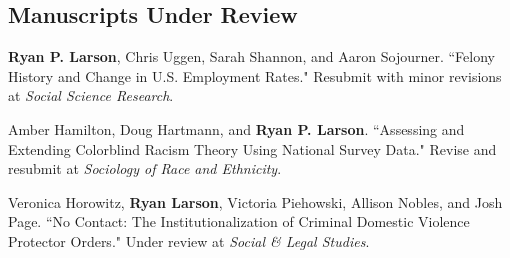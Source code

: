 \documentclass[letterpaper]{article}
\renewenvironment{itemize}{
  \begin{list}{}{
    \setlength{\leftmargin}{1.5em}
  }
}{
  \end{list}
}
\begin{document}
\subsection*{Manuscripts Under Review}
\begin{itemize}

\item  \textbf{Ryan P. Larson}, Chris Uggen, Sarah Shannon, and Aaron Sojourner. ``Felony History and Change in U.S. Employment Rates." Resubmit with minor revisions at \textit{Social Science Research}.

\item Amber Hamilton, Doug Hartmann, and \textbf{Ryan P. Larson}. ``Assessing and Extending Colorblind Racism Theory Using National Survey Data." Revise and resubmit at \textit{Sociology of Race and Ethnicity}. 

\item Veronica Horowitz,  \textbf{Ryan Larson}, Victoria Piehowski, Allison Nobles, and Josh Page. ``No Contact: The Institutionalization of Criminal Domestic Violence Protector Orders." Under review at \textit{Social \& Legal Studies}.



\end{itemize}
\end{document}
